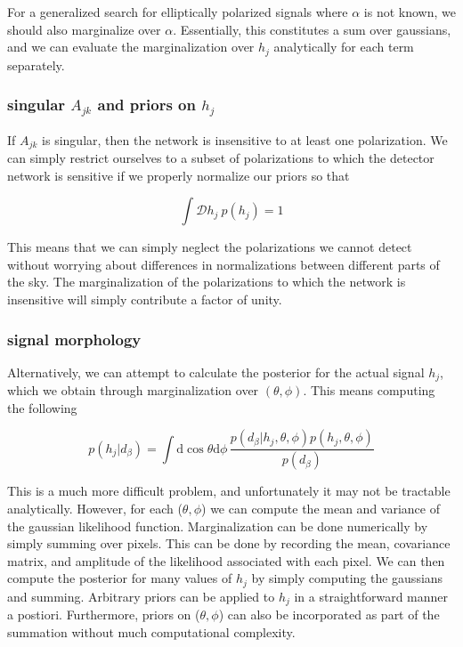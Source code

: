 \documentclass[10pt]{article}
\begin{document}
For a generalized search for elliptically polarized signals where $\alpha$ is not known, we should also marginalize over $\alpha$. Essentially, this constitutes a sum over gaussians, and we can evaluate the marginalization over $h_j$ analytically for each term separately.

\subsubsection{singular $A_{jk}$ and priors on $h_j$}

If $A_{jk}$ is singular, then the network is insensitive to at least one polarization. We can simply restrict ourselves to a subset of polarizations to which the detector network is sensitive if we properly normalize our priors so that

\begin{equation}
\int\mathcal{D}h_j\ p(h_j) = 1
\end{equation}

This means that we can simply neglect the polarizations we cannot detect without worrying about differences in normalizations between different parts of the sky. The marginalization of the polarizations to which the network is insensitive will simply contribute a factor of unity.


\subsubsection{signal morphology}

Alternatively, we can attempt to calculate the posterior for the actual signal $h_j$, which we obtain through marginalization over $(\theta, \phi)$. This means computing the following

\begin{equation}
p(h_j|d_\beta) = \int\mathrm{d}\cos\theta\mathrm{d}\phi\, \frac{p(d_\beta|h_j, \theta, \phi)p(h_j, \theta, \phi)}{p(d_\beta)}
\end{equation}

This is a much more difficult problem, and unfortunately it may not be tractable analytically. However, for each ($\theta,\phi$) we can compute the mean and variance of the gaussian likelihood function. Marginalization can be done numerically by simply summing over pixels. This can be done by recording the mean, covariance matrix, and amplitude of the likelihood associated with each pixel. We can then compute the posterior for many values of $h_j$ by simply computing the gaussians and summing. Arbitrary priors can be applied to $h_j$ in a straightforward manner a postiori. Furthermore, priors on ($\theta,\phi$) can also be incorporated as part of the summation without much computational complexity.
\end{document}
